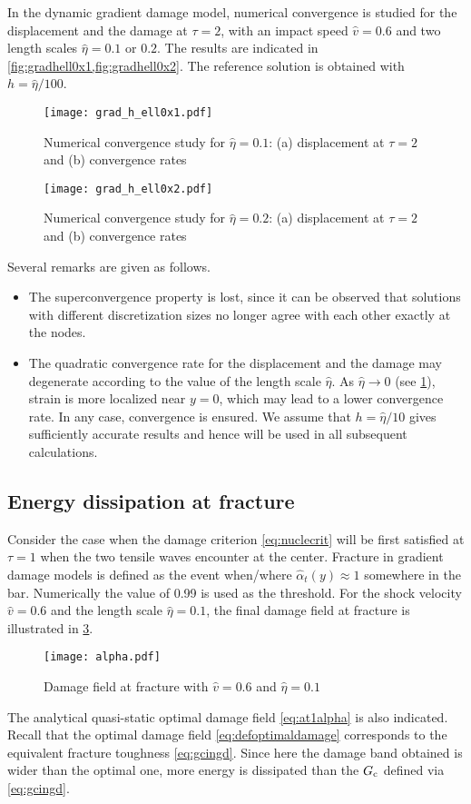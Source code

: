 In the dynamic gradient damage model, numerical convergence is studied for the displacement and the damage at $\tau=2$, with an impact speed $\widehat{v}=0.6$ and two length scales $\widehat{\eta}=0.1$ or $0.2$. The results are indicated in \cref{fig:gradhell0x1,fig:gradhell0x2}. The reference solution is obtained with $h=\widehat{\eta}/100$.
\begin{figure}[htbp]
\texttt{[image: grad\_h\_ell0x1.pdf]}
\caption{Numerical convergence study for $\widehat{\eta}=0.1$: (a) displacement at $\tau=2$ and (b) convergence rates} \label{fig:gradhell0x1}
\end{figure}
\begin{figure}[htbp]
\texttt{[image: grad\_h\_ell0x2.pdf]}
\caption{Numerical convergence study for $\widehat{\eta}=0.2$: (a) displacement at $\tau=2$ and (b) convergence rates} \label{fig:gradhell0x2}
\end{figure}
Several remarks are given as follows.
\begin{itemize}
\item The superconvergence property is lost, since it can be observed that solutions with different discretization sizes no longer agree with each other exactly at the nodes.
\item The quadratic convergence rate for the displacement and the damage may degenerate according to the value of the length scale $\widehat{\eta}$. As $\widehat{\eta}\to 0$ (see \cref{fig:gradhell0x1}), strain is more localized near $y=0$, which may lead to a lower convergence rate. In any case, convergence is ensured. We assume that $h=\widehat{\eta}/10$ gives sufficiently accurate results and hence will be used in all subsequent calculations.
\end{itemize}

\subsection{Energy dissipation at fracture}
Consider the case when the damage criterion \eqref{eq:nuclecrit} will be first satisfied at $\tau=1$ when the two tensile waves encounter at the center. Fracture in gradient damage models is defined as the event when/where $\widehat{\alpha}_t(y)\approx 1$ somewhere in the bar. Numerically the value of 0.99 is used as the threshold. For the shock velocity $\widehat{v}=0.6$ and the length scale $\widehat{\eta}=0.1$, the final damage field at fracture is illustrated in \cref{fig:alphatf}.
\begin{figure}[htbp]
\centering
\texttt{[image: alpha.pdf]}
\caption{Damage field at fracture with $\widehat{v}=0.6$ and $\widehat{\eta}=0.1$} \label{fig:alphatf}
\end{figure}
The analytical quasi-static optimal damage field \eqref{eq:at1alpha} is also indicated. Recall that the optimal damage field \eqref{eq:defoptimaldamage} corresponds to the equivalent fracture toughness \eqref{eq:gcingd}. Since here the damage band obtained is wider than the optimal one, more energy is dissipated than the $G_\mathrm{c}$ defined via \eqref{eq:gcingd}.

